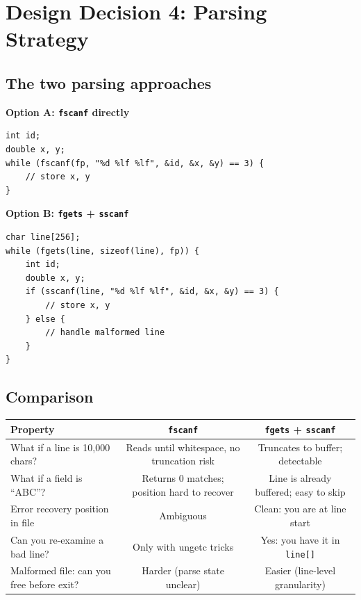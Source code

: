 \documentclass[11pt]{article}
\begin{document}
\newpage

\section{Design Decision 4: Parsing Strategy}

\subsection{The two parsing approaches}

\textbf{Option A: \texttt{fscanf} directly}
\begin{lstlisting}[style=cstyle]
int id;
double x, y;
while (fscanf(fp, "%d %lf %lf", &id, &x, &y) == 3) {
    // store x, y
}
\end{lstlisting}

\textbf{Option B: \texttt{fgets} + \texttt{sscanf}}
\begin{lstlisting}[style=cstyle]
char line[256];
while (fgets(line, sizeof(line), fp)) {
    int id;
    double x, y;
    if (sscanf(line, "%d %lf %lf", &id, &x, &y) == 3) {
        // store x, y
    } else {
        // handle malformed line
    }
}
\end{lstlisting}

\subsection{Comparison}

\begin{center}
\renewcommand{\arraystretch}{1.5}
\begin{tabular}{lcc}
\toprule
Property & \texttt{fscanf} & \texttt{fgets} + \texttt{sscanf} \\
\midrule
What if a line is 10,000 chars? & Reads until whitespace, no truncation risk & Truncates to buffer; detectable \\
What if a field is ``ABC''? & Returns 0 matches; position hard to recover & Line is already buffered; easy to skip \\
Error recovery position in file & Ambiguous & Clean: you are at line start \\
Can you re-examine a bad line? & Only with ungetc tricks & Yes: you have it in \texttt{line[]} \\
Malformed file: can you free before exit? & Harder (parse state unclear) & Easier (line-level granularity) \\
\bottomrule
\end{tabular}
\end{center}
\end{document}
